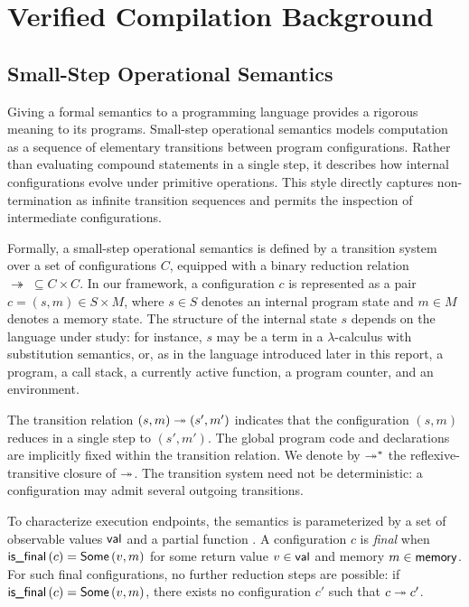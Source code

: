 \documentclass[report.tex]{subfiles}
\begin{document}
\section{Verified Compilation Background}

\subsection{Small-Step Operational Semantics}

Giving a formal semantics to a programming language
provides a rigorous meaning to its programs.
Small-step operational semantics models computation
as a sequence of elementary transitions between program configurations.
Rather than evaluating compound statements in a single step,
it describes how internal configurations evolve under primitive operations.
This style directly captures non-termination as infinite transition sequences
and permits the inspection of intermediate configurations.

Formally,
a small-step operational semantics is defined by a transition system
over a set of configurations $C$,
equipped with a binary reduction relation
$\twoheadrightarrow \;\subseteq C \times C$.
In our framework,
a configuration $c$ is represented as a pair $c = (s, m) \in S \times M$,
where $s \in S$ denotes an internal program state
and $m \in M$ denotes a memory state.
The structure of the internal state $s$ depends on the language under study:
for instance,
$s$ may be a term in a $\lambda$-calculus with substitution semantics,
or,
as in the \muRTL{} language introduced later in this report,
a program,
a call stack,
a currently active function,
a program counter,
and an environment.

The transition relation $\step{(s, m)}{(s', m')}$
indicates that the configuration $(s, m)$ reduces in a single step
to $(s', m')$.
The global program code and declarations are implicitly fixed
within the transition relation.
We denote by $\steps{}{}$
the reflexive-transitive closure of $\step{}{}$.
The transition system need not be deterministic:
a configuration may admit several outgoing transitions.

To characterize execution endpoints,
the semantics is parameterized by a set of observable values $\textsf{val}$
and a partial function \isfinalf.
A configuration $c$ is \emph{final}
when $\isfinal{c} = \Some{v, m}$ for some return value $v \in \textsf{val}$
and memory $m \in \textsf{memory}$.
For such final configurations,
no further reduction steps are possible:
if $\isfinal{c} = \Some{v, m}$,
there exists no configuration $c'$
such that $\step{c}{c'}$.
\end{document}
